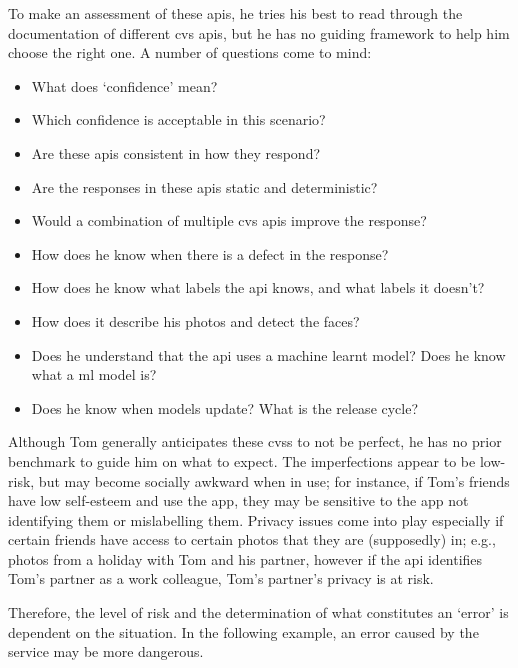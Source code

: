 

To make an assessment of these \glspl{api}, he tries his best to read through the documentation of different \gls{cvs} \glspl{api}, but he has no guiding framework to help him choose the right one. A number of questions come to mind:

\begin{itemize}
  \item What does `confidence' mean?%
  \item Which confidence is acceptable in this scenario?%
  \item Are these \glspl{api} consistent in how they respond?%
  \item Are the responses in these \glspl{api} static and deterministic?%
  \item Would a combination of multiple \gls{cvs} \glspl{api} improve the response?%
  \item How does he know when there is a defect in the response?%
  \item How does he know what labels the \gls{api} knows, and what labels it doesn't?%
  \item How does it describe his photos and detect the faces?%
  \item Does he understand that the \gls{api} uses a machine learnt model? Does he know what a \gls{ml} model is?%
  \item Does he know when models update? What is the release cycle?%
\end{itemize}

Although Tom generally anticipates these \glspl{cvs} to not be perfect, he has no prior benchmark to guide him on what to expect. The imperfections appear to be low-risk, but may become socially awkward when in use; for instance, if Tom's friends have low self-esteem and use the app, they may be sensitive to the app not identifying them or mislabelling them. Privacy issues come into play especially if certain friends have access to certain photos that they are (supposedly) in; e.g., photos from a holiday with Tom and his partner, however if the \gls{api} identifies Tom's partner as a work colleague, Tom's partner's privacy is at risk.

Therefore, the level of risk and the determination of what constitutes an `error' is dependent on the situation. In the following example, an error caused by the service may be more dangerous.

